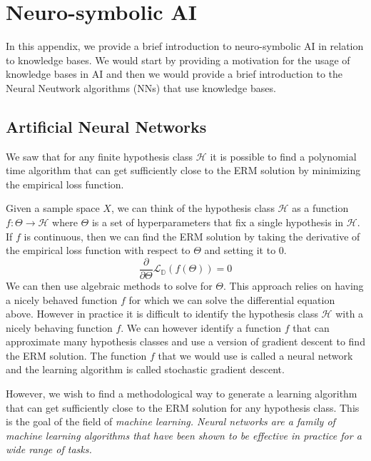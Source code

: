 

%
\chapter*{\thechapter \quad Neuro-symbolic AI}
\label{appendixB}
In this appendix, we provide a brief introduction to neuro-symbolic AI in relation to knowledge bases.
We would start by providing a motivation for the usage of knowledge bases in AI and then we would
provide a brief introduction to the Neural Neutwork algorithms (NNs) that use knowledge bases.




\section{Artificial Neural Networks}
We saw that for any
finite hypothesis class $\mathcal{H}$ it is possible to find a polynomial time 
algorithm that can get sufficiently close to the ERM solution by 
minimizing the empirical loss function.

Given a sample space $X$,
we can think of the hypothesis class $\mathcal{H}$ as
a function $f:\Theta\to\mathcal{H}$
where $\Theta$ is a set of hyperparameters 
that fix a single hypothesis in $\mathcal{H}$.
If $f$ is continuous, then we can find the ERM solution by
taking the derivative of the empirical loss function with respect to $\Theta$ and setting it to $0$.
\[
    \frac{\partial}{\partial\Theta}\mathcal{L}_{\mathbb{D}}(f(\Theta))=0    
\]
We can then use algebraic methods to solve for $\Theta$. 
This approach relies on having a nicely behaved function $f$ for which we can solve
the differential equation above.
However in practice it is difficult to identify the hypothesis class $\mathcal{H}$ 
with a nicely behaving function $f$.
We can however identify a function $f$ that can approximate many hypothesis classes
and use a version of gradient descent to find the ERM solution.
The function $f$ that we would use is called a neural network and the learning
algorithm is called stochastic gradient descent.

However, we wish to find a methodological way to generate a learning algorithm
that can get sufficiently close to the ERM solution for any hypothesis class.
This is the goal of the field of \it{machine learning}.
Neural networks are a family of machine learning algorithms that have been shown to be
effective in practice for a wide range of tasks. 

